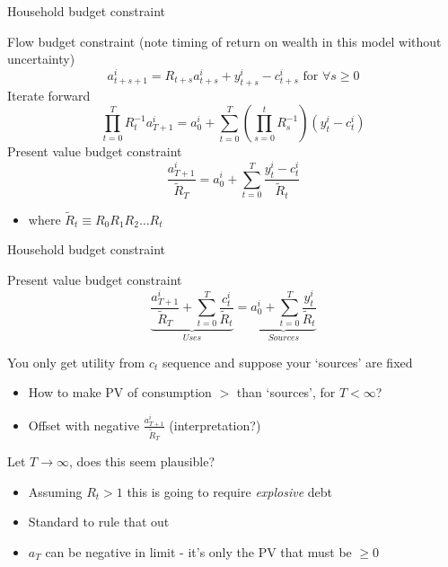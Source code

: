 \begin{frame}{Household budget constraint}

Flow budget constraint (note timing of return on wealth in this model without uncertainty)
\begin{equation*}
a_{t+s+1}^{i}=R_{t+s}a_{t+s}^{i}+y_{t+s}^{i}-c_{t+s}^{i}\text{ for }\forall s\geq 0
\end{equation*}
Iterate forward
\begin{equation*}
\prod\limits_{t=0}^{T}R_{t}^{-1}a_{T+1}^{i}=a_{0}^{i}+\sum_{t=0}^{T}\left(\prod\limits_{s=0}^{t}R_{s}^{-1}\right) \left( y_{t}^{i}-c_{t}^{i}\right)
\end{equation*}
Present value budget constraint
\begin{equation*}
\frac{a_{T+1}^{i}}{\tilde{R}_{T}}=a_{0}^{i}+\sum\limits_{t=0}^{T}\frac{y_{t}^{i}-c_{t}^{i}}{\tilde{R}_{t}}
\end{equation*}
\begin{itemize}
\item[]	where $\tilde{R}_{t} \equiv R_{0}R_{1}R_{2}\ldots R_{t}$
\end{itemize}

\end{frame}


\begin{frame}{Household budget constraint}

Present value budget constraint
\begin{equation*}
\underbrace{\frac{a_{T+1}^{i}}{\tilde{R}_{T}} +\sum\limits_{t=0}^{T}\frac{c_{t}^{i}}{\tilde{R}_{t}}}_{Uses} = \underbrace{a_{0}^{i}+\sum\limits_{t=0}^{T}\frac{y_{t}^{i}}{\tilde{R}_{t}}}_{Sources}
\end{equation*}

You only get utility from $c_{t}$ sequence and suppose your `sources' are fixed
\begin{itemize}
\item	How to make PV of consumption $>$ than `sources', for $T<\infty$?
\item	Offset with negative $\frac{a_{T+1}^{i}}{\tilde{R}_{T}}$ (interpretation?)
\end{itemize}

Let $T \rightarrow \infty$, does this seem plausible?
\begin{itemize}
\item	Assuming $R_{t} > 1$ this is going to require \textit{explosive} debt
\item	Standard to rule that out
\item	$a_{T}$ can be negative in limit - it's only the PV that must be $\geq 0$
\end{itemize}

\end{frame}

